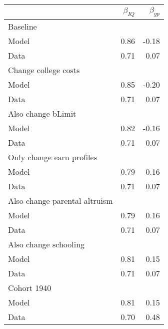 \begin{tabular}{lrr}
\hline
  & $\beta_{IQ}$  & $\beta_{yp}$  \\
\hline
Baseline &   &   \\
Model & 0.86  & -0.18  \\
Data & 0.71  & 0.07  \\
Change college costs &   &   \\
Model & 0.85  & -0.20  \\
Data & 0.71  & 0.07  \\
Also change bLimit &   &   \\
Model & 0.82  & -0.16  \\
Data & 0.71  & 0.07  \\
Only change earn profiles &   &   \\
Model & 0.79  & 0.16  \\
Data & 0.71  & 0.07  \\
Also change parental altruism &   &   \\
Model & 0.79  & 0.16  \\
Data & 0.71  & 0.07  \\
Also change schooling &   &   \\
Model & 0.81  & 0.15  \\
Data & 0.71  & 0.07  \\
Cohort 1940 &   &   \\
Model & 0.81  & 0.15  \\
Data & 0.70  & 0.48  \\
\hline
\end{tabular}%
